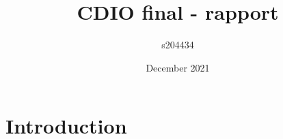 \documentclass{article}
\title{CDIO final - rapport}
\author{s204434 }
\date{December 2021}
\begin{document}
\maketitle

\section{Introduction}
\end{document}

